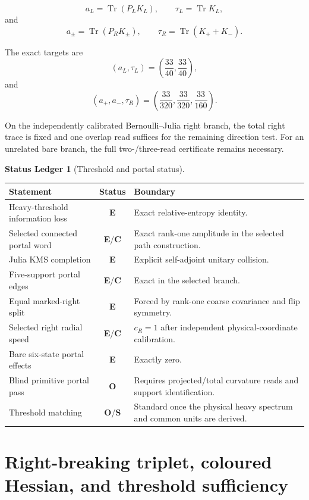 \documentclass[11pt,oneside,openany]{book}
\numberwithin{equation}{chapter}
\theoremstyle{definition}
\newtheorem{ledger}[theorem]{Status Ledger}
\theoremstyle{remark}
\newcommand{\Tr}{\operatorname{Tr}}
\newcommand{\statusE}{\textcolor{ExactColor}{\textbf{E}}}
\newcommand{\statusC}{\textcolor{CondColor}{\textbf{C}}}
\newcommand{\statusS}{\textcolor{StdColor}{\textbf{S}}}
\newcommand{\statusO}{\textcolor{OpenColor}{\textbf{O}}}
\begin{document}
\[
 a_L=\Tr(P_LK_L),
 \qquad
 \tau_L=\Tr K_L,
\]
and
\[
 a_\pm=\Tr(P_RK_\pm),
 \qquad
 \tau_R=\Tr(K_++K_-).
\]

The exact targets are
\[
 (a_L,\tau_L)
 =
 \left(\frac{33}{40},\frac{33}{40}\right),
\]
and
\[
 \left(
 a_+,a_-,\tau_R
 \right)
 =
 \left(
 \frac{33}{320},
 \frac{33}{320},
 \frac{33}{160}
 \right).
\]

On the independently calibrated Bernoulli--Julia right branch, the total
right trace is fixed and one overlap read suffices for the remaining
direction test.  For an unrelated bare branch, the full two-/three-read
certificate remains necessary.

\begin{ledger}[Threshold and portal status]
\begin{center}
\begin{tabularx}{0.96\textwidth}{@{}p{}cX@{}}
\toprule
Statement & Status & Boundary\\
\midrule
Heavy-threshold information loss
& \statusE
& Exact relative-entropy identity.\\
Selected connected portal word
& \statusE/\statusC
& Exact rank-one amplitude in the selected path construction.\\
Julia KMS completion
& \statusE
& Explicit self-adjoint unitary collision.\\
Five-support portal edges
& \statusE/\statusC
& Exact in the selected branch.\\
Equal marked-right split
& \statusE
& Forced by rank-one coarse covariance and flip symmetry.\\
Selected right radial speed
& \statusE/\statusC
& \(c_R=1\) after independent physical-coordinate calibration.\\
Bare six-state portal effects
& \statusE
& Exactly zero.\\
Blind primitive portal pass
& \statusO
& Requires projected/total curvature reads and support identification.\\
Threshold matching
& \statusO/\statusS
& Standard once the physical heavy spectrum and common units are derived.\\
\bottomrule
\end{tabularx}
\end{center}
\end{ledger}

\chapter{Right-breaking triplet, coloured Hessian, and threshold sufficiency}
\label{ch:v5-coloured-scalar}
\end{document}
